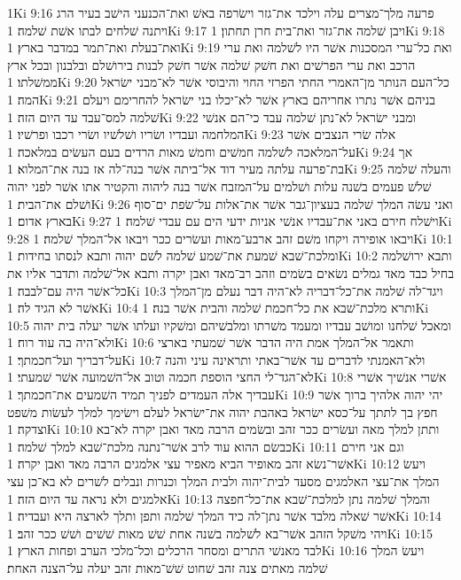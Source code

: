 1Ki 9:16  פרעה מלך־מצרים עלה וילכד את־גזר וישׂרפה באשׁ ואת־הכנעני הישׁב בעיר הרג ויתנה שׁלחים לבתו אשׁת שׁלמה׃
1Ki 9:17  ויבן שׁלמה את־גזר ואת־בית חרן תחתון׃
1Ki 9:18  ואת־בעלת ואת־תמר במדבר בארץ׃
1Ki 9:19  ואת כל־ערי המסכנות אשׁר היו לשׁלמה ואת ערי הרכב ואת ערי הפרשׁים ואת חשׁק שׁלמה אשׁר חשׁק לבנות בירושׁלם ובלבנון ובכל ארץ ממשׁלתו׃
1Ki 9:20  כל־העם הנותר מן־האמרי החתי הפרזי החוי והיבוסי אשׁר לא־מבני ישׂראל המה׃
1Ki 9:21  בניהם אשׁר נתרו אחריהם בארץ אשׁר לא־יכלו בני ישׂראל להחרימם ויעלם שׁלמה למס־עבד עד היום הזה׃
1Ki 9:22  ומבני ישׂראל לא־נתן שׁלמה עבד כי־הם אנשׁי המלחמה ועבדיו ושׂריו ושׁלשׁיו ושׂרי רכבו ופרשׁיו׃
1Ki 9:23  אלה שׂרי הנצבים אשׁר על־המלאכה לשׁלמה חמשׁים וחמשׁ מאות הרדים בעם העשׂים במלאכה׃
1Ki 9:24  אך בת־פרעה עלתה מעיר דוד אל־ביתה אשׁר בנה־לה אז בנה את־המלוא׃
1Ki 9:25  והעלה שׁלמה שׁלשׁ פעמים בשׁנה עלות ושׁלמים על־המזבח אשׁר בנה ליהוה והקטיר אתו אשׁר לפני יהוה ושׁלם את־הבית׃
1Ki 9:26  ואני עשׂה המלך שׁלמה בעציון־גבר אשׁר את־אלות על־שׂפת ים־סוף בארץ אדום׃
1Ki 9:27  וישׁלח חירם באני את־עבדיו אנשׁי אניות ידעי הים עם עבדי שׁלמה׃
1Ki 9:28  ויבאו אופירה ויקחו משׁם זהב ארבע־מאות ועשׂרים ככר ויבאו אל־המלך שׁלמה׃
1Ki 10:1  ומלכת־שׁבא שׁמעת את־שׁמע שׁלמה לשׁם יהוה ותבא לנסתו בחידות׃
1Ki 10:2  ותבא ירושׁלמה בחיל כבד מאד גמלים נשׂאים בשׂמים וזהב רב־מאד ואבן יקרה ותבא אל־שׁלמה ותדבר אליו את כל־אשׁר היה עם־לבבה׃
1Ki 10:3  ויגד־לה שׁלמה את־כל־דבריה לא־היה דבר נעלם מן־המלך אשׁר לא הגיד לה׃
1Ki 10:4  ותרא מלכת־שׁבא את כל־חכמת שׁלמה והבית אשׁר בנה׃
1Ki 10:5  ומאכל שׁלחנו ומושׁב עבדיו ומעמד משׁרתו ומלבשׁיהם ומשׁקיו ועלתו אשׁר יעלה בית יהוה ולא־היה בה עוד רוח׃
1Ki 10:6  ותאמר אל־המלך אמת היה הדבר אשׁר שׁמעתי בארצי על־דבריך ועל־חכמתך׃
1Ki 10:7  ולא־האמנתי לדברים עד אשׁר־באתי ותראינה עיני והנה לא־הגד־לי החצי הוספת חכמה וטוב אל־השׁמועה אשׁר שׁמעתי׃
1Ki 10:8  אשׁרי אנשׁיך אשׁרי עבדיך אלה העמדים לפניך תמיד השׁמעים את־חכמתך׃
1Ki 10:9  יהי יהוה אלהיך ברוך אשׁר חפץ בך לתתך על־כסא ישׂראל באהבת יהוה את־ישׂראל לעלם וישׂימך למלך לעשׂות משׁפט וצדקה׃
1Ki 10:10  ותתן למלך מאה ועשׂרים ככר זהב ובשׂמים הרבה מאד ואבן יקרה לא־בא כבשׂם ההוא עוד לרב אשׁר־נתנה מלכת־שׁבא למלך שׁלמה׃
1Ki 10:11  וגם אני חירם אשׁר־נשׂא זהב מאופיר הביא מאפיר עצי אלמגים הרבה מאד ואבן יקרה׃
1Ki 10:12  ויעשׂ המלך את־עצי האלמגים מסעד לבית־יהוה ולבית המלך וכנרות ונבלים לשׁרים לא בא־כן עצי אלמגים ולא נראה עד היום הזה׃
1Ki 10:13  והמלך שׁלמה נתן למלכת־שׁבא את־כל־חפצה אשׁר שׁאלה מלבד אשׁר נתן־לה כיד המלך שׁלמה ותפן ותלך לארצה היא ועבדיה׃
1Ki 10:14  ויהי משׁקל הזהב אשׁר־בא לשׁלמה בשׁנה אחת שׁשׁ מאות שׁשׁים ושׁשׁ ככר זהב׃
1Ki 10:15  לבד מאנשׁי התרים ומסחר הרכלים וכל־מלכי הערב ופחות הארץ׃
1Ki 10:16  ויעשׂ המלך שׁלמה מאתים צנה זהב שׁחוט שׁשׁ־מאות זהב יעלה על־הצנה האחת׃
